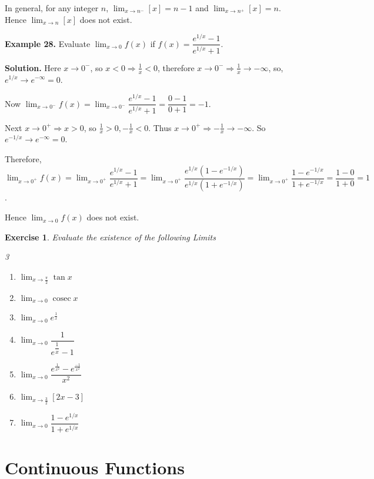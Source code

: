 \documentclass[../../main.tex]{subfiles}
\DeclareMathOperator{\cosec}{cosec}
\newtheorem{exercise}{Exercise}[section]
\begin{document}
In general, for any integer $n$, $\lim_{x\rightarrow n^-}[x] = n-1$ and  $\lim_{x\rightarrow n^+}[x] = n$. Hence $\lim_{x\rightarrow n}{[x]}$ does not exist.

\vspace{0.2cm}
\textbf{Example 28.}
\vspace{0.2cm}
Evaluate $\lim_{x\rightarrow 0}f(x)$ if $f(x) = \dfrac{e^{1/x}-1}{e^{1/x}+1}$.

\textbf{Solution.} Here $x\rightarrow 0^-$, so $x < 0 \Rightarrow \frac{1}{x} < 0$, therefore  $x\rightarrow 0^- \Rightarrow \frac{1}{x}\to -\infty$, so, $e^{1/x} \to e^{-\infty} = 0$.

Now $\lim_{x\rightarrow 0^{-}}f(x) = \lim_{x\rightarrow 0^{-}}{\dfrac{e^{1/x}-1}{e^{1/x}+1}} = \dfrac{0-1}{0+1} =-1$.

Next $x\rightarrow 0^+ \Rightarrow x > 0$, so $\frac{1}{x} > 0, -\frac{1}{x} < 0$. Thus   $x\rightarrow 0^+ \Rightarrow -\frac{1}{x}\rightarrow -\infty$. So $e^{-1/x}\rightarrow e^{-\infty} = 0$.
   
Therefore, $\lim_{x\rightarrow 0^+}f(x) = \lim_{x\rightarrow 0^+}{\dfrac{e^{1/x}-1}{e^{1/x}+1}} =
  \lim_{x\rightarrow 0^{+}}\dfrac{e^{1/x}(1-e^{-1/x})}{e^{1/x}(1+e^{-1/x})} = \lim_{x\rightarrow 0^{+}}\dfrac{1-e^{-1/x}}{1+e^{-1/x}} =\dfrac{1-0}{1+0}=1$.
    
Hence $\lim_{x\rightarrow 0} f(x)$  does not exist.


\begin{exercise}
Evaluate the existence of the following Limits
\begin{multicols}{3}
\begin{enumerate}
    \item $\lim_{x \rightarrow \frac{\pi}{2}} \tan x$
    \item $\lim_{x \rightarrow 0} \cosec x$
    \item $\lim_{x \rightarrow 0} e^\frac{1}{x}$
    \item $\lim_{x \rightarrow 0} \dfrac{1}{e^{\dfrac{1}{x}}-1}$
    \item $\lim_{x \rightarrow 0} \dfrac{e^\frac{1}{x^2}-e^\frac{-1}{x^2}}{x^2}$
    \item $\lim_{x \rightarrow \frac{3}{2}}$$[2x-3]$
    \item $\lim_{x \rightarrow 0} \dfrac{1-e^{1/x}}{1+e^{1/x}}$
\end{enumerate}
\end{multicols}
\end{exercise}
 
\section{Continuous Functions}
\end{document}
